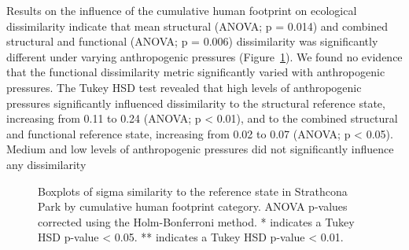 \documentclass[
]{agujournal2019}
\begin{document}
Results on the influence of the cumulative human footprint on ecological
dissimilarity indicate that mean structural (ANOVA; p = 0.014) and
combined structural and functional (ANOVA; p = 0.006) dissimilarity was
significantly different under varying anthropogenic pressures
(Figure~\ref{fig-boxplot-overall}). We found no evidence that the
functional dissimilarity metric significantly varied with anthropogenic
pressures. The Tukey HSD test revealed that high levels of anthropogenic
pressures significantly influenced dissimilarity to the structural
reference state, increasing from 0.11 to 0.24 (ANOVA; p \textless{}
0.01), and to the combined structural and functional reference state,
increasing from 0.02 to 0.07 (ANOVA; p \textless{} 0.05). Medium and low
levels of anthropogenic pressures did not significantly influence any
dissimilarity

\label{cell-fig-boxplot-overall}
\begin{figure}[H]


\caption{\label{fig-boxplot-overall}Boxplots of sigma similarity to the
reference state in Strathcona Park by cumulative human footprint
category. ANOVA p-values corrected using the Holm-Bonferroni method. *
indicates a Tukey HSD p-value \textless{} 0.05. ** indicates a Tukey HSD
p-value \textless{} 0.01.}

\end{figure}%
\end{document}
